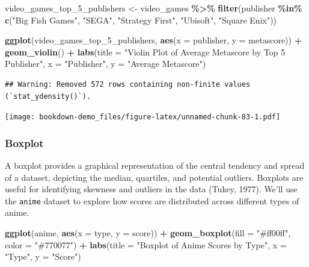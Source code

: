 \documentclass[
  b5paper]{book}
\newenvironment{Shaded}{\begin{snugshade}}{\end{snugshade}}
\newcommand{\AttributeTok}[1]{\textcolor[rgb]{0.13,0.29,0.53}{#1}}
\newcommand{\FunctionTok}[1]{\textcolor[rgb]{0.13,0.29,0.53}{\textbf{#1}}}
\newcommand{\NormalTok}[1]{#1}
\newcommand{\OtherTok}[1]{\textcolor[rgb]{0.56,0.35,0.01}{#1}}
\newcommand{\SpecialCharTok}[1]{\textcolor[rgb]{0.81,0.36,0.00}{\textbf{#1}}}
\newcommand{\StringTok}[1]{\textcolor[rgb]{0.31,0.60,0.02}{#1}}
\begin{document}
\begin{Shaded}
\begin{Highlighting}[]
\NormalTok{video\_games\_top\_5\_publishers }\OtherTok{\textless{}{-}}\NormalTok{ video\_games }\SpecialCharTok{\%\textgreater{}\%}
  \FunctionTok{filter}\NormalTok{(publisher }\SpecialCharTok{\%in\%} \FunctionTok{c}\NormalTok{(}\StringTok{"Big Fish Games"}\NormalTok{, }\StringTok{"SEGA"}\NormalTok{, }\StringTok{"Strategy First"}\NormalTok{, }\StringTok{"Ubisoft"}\NormalTok{, }\StringTok{"Square Enix"}\NormalTok{))}

\FunctionTok{ggplot}\NormalTok{(video\_games\_top\_5\_publishers, }\FunctionTok{aes}\NormalTok{(}\AttributeTok{x =}\NormalTok{ publisher, }\AttributeTok{y =}\NormalTok{ metascore)) }\SpecialCharTok{+}
  \FunctionTok{geom\_violin}\NormalTok{() }\SpecialCharTok{+}
  \FunctionTok{labs}\NormalTok{(}\AttributeTok{title =} \StringTok{"Violin Plot of Average Metascore by Top 5 Publisher"}\NormalTok{,}
       \AttributeTok{x =} \StringTok{"Publisher"}\NormalTok{,}
       \AttributeTok{y =} \StringTok{"Average Metascore"}\NormalTok{)}
\end{Highlighting}
\end{Shaded}

\begin{verbatim}
## Warning: Removed 572 rows containing non-finite values (`stat_ydensity()`).
\end{verbatim}

\texttt{[image: bookdown-demo\_files/figure-latex/unnamed-chunk-83-1.pdf]}

\hypertarget{boxplot}{%
\subsubsection*{Boxplot}\label{boxplot}}

A boxplot provides a graphical representation of the central tendency and spread of a dataset, depicting the median, quartiles, and potential outliers. Boxplots are useful for identifying skewness and outliers in the data (Tukey, 1977). We'll use the \texttt{anime} dataset to explore how scores are distributed across different types of anime.

\begin{Shaded}
\begin{Highlighting}[]
\FunctionTok{ggplot}\NormalTok{(anime, }\FunctionTok{aes}\NormalTok{(}\AttributeTok{x =}\NormalTok{ type, }\AttributeTok{y =}\NormalTok{ score)) }\SpecialCharTok{+}
  \FunctionTok{geom\_boxplot}\NormalTok{(}\AttributeTok{fill =} \StringTok{"\#ff00ff"}\NormalTok{, }\AttributeTok{color =} \StringTok{"\#770077"}\NormalTok{) }\SpecialCharTok{+}
  \FunctionTok{labs}\NormalTok{(}\AttributeTok{title =} \StringTok{"Boxplot of Anime Scores by Type"}\NormalTok{,}
       \AttributeTok{x =} \StringTok{"Type"}\NormalTok{,}
       \AttributeTok{y =} \StringTok{"Score"}\NormalTok{)}
\end{Highlighting}
\end{Shaded}
\end{document}
